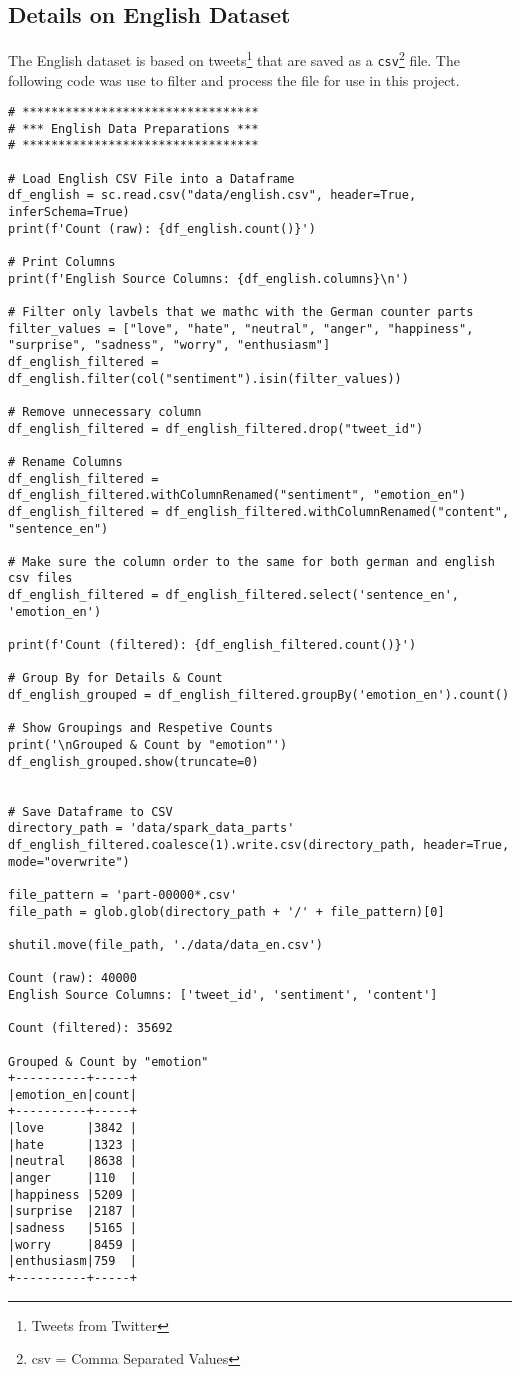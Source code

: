 \subsection{Details on English Dataset}
\label{appendix:dataset_english}
The English dataset is based on tweets\footnote{Tweets from Twitter} that are saved as a \texttt{csv}\footnote{csv = Comma Separated Values} file. The following code was use to filter and process the file for use in this project.
\begin{verbatim}
# *********************************
# *** English Data Preparations ***
# *********************************

# Load English CSV File into a Dataframe
df_english = sc.read.csv("data/english.csv", header=True, inferSchema=True)
print(f'Count (raw): {df_english.count()}')

# Print Columns
print(f'English Source Columns: {df_english.columns}\n')

# Filter only lavbels that we mathc with the German counter parts
filter_values = ["love", "hate", "neutral", "anger", "happiness", "surprise", "sadness", "worry", "enthusiasm"]
df_english_filtered = df_english.filter(col("sentiment").isin(filter_values))

# Remove unnecessary column
df_english_filtered = df_english_filtered.drop("tweet_id")

# Rename Columns
df_english_filtered = df_english_filtered.withColumnRenamed("sentiment", "emotion_en")
df_english_filtered = df_english_filtered.withColumnRenamed("content", "sentence_en")

# Make sure the column order to the same for both german and english csv files
df_english_filtered = df_english_filtered.select('sentence_en', 'emotion_en')

print(f'Count (filtered): {df_english_filtered.count()}')

# Group By for Details & Count
df_english_grouped = df_english_filtered.groupBy('emotion_en').count()

# Show Groupings and Respetive Counts
print('\nGrouped & Count by "emotion"')
df_english_grouped.show(truncate=0)


# Save Dataframe to CSV
directory_path = 'data/spark_data_parts'
df_english_filtered.coalesce(1).write.csv(directory_path, header=True, mode="overwrite")

file_pattern = 'part-00000*.csv'
file_path = glob.glob(directory_path + '/' + file_pattern)[0]

shutil.move(file_path, './data/data_en.csv')

Count (raw): 40000
English Source Columns: ['tweet_id', 'sentiment', 'content']

Count (filtered): 35692

Grouped & Count by "emotion"
+----------+-----+
|emotion_en|count|
+----------+-----+
|love      |3842 |
|hate      |1323 |
|neutral   |8638 |
|anger     |110  |
|happiness |5209 |
|surprise  |2187 |
|sadness   |5165 |
|worry     |8459 |
|enthusiasm|759  |
+----------+-----+
\end{verbatim}
\clearpage

